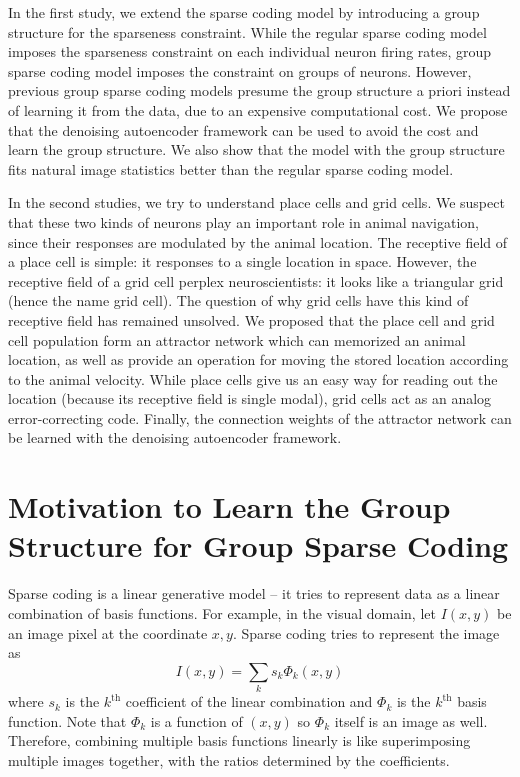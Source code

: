 In the first study, we extend the sparse coding model by introducing a group structure for the sparseness constraint. While the regular sparse coding model imposes the sparseness constraint on each individual neuron firing rates, group sparse coding model imposes the constraint on groups of neurons. However, previous group sparse coding models presume the group structure a priori instead of learning it from the data, due to an expensive computational cost. We propose that the denoising autoencoder framework can be used to avoid the cost and learn the group structure. We also show that the model with the group structure fits natural image statistics better than the regular sparse coding model.

In the second studies, we try to understand place cells and grid cells. We suspect that these two kinds of neurons play an important role in animal navigation, since their responses are modulated by the animal location. The receptive field of a place cell is simple: it responses to a single location in space. However, the receptive field of a grid cell perplex neuroscientists: it looks like a triangular grid (hence the name grid cell). The question of why grid cells have this kind of receptive field has remained unsolved. We proposed that the place cell and grid cell population form an attractor network which can memorized an animal location, as well as provide an operation for moving the stored location according to the animal velocity. While place cells give us an easy way for reading out the location (because its receptive field is single modal), grid cells act as an analog error-correcting code. Finally, the connection weights of the attractor network can be learned with the denoising autoencoder framework.

\section{Motivation to Learn the Group Structure for Group Sparse Coding}

Sparse coding is a linear generative model -- it tries to represent data as a linear combination of basis functions. For example, in the visual domain, let $I(x, y)$ be an image pixel at the coordinate $x,y$. Sparse coding tries to represent the image as
\begin{equation}
I(x,y) = \sum_k s_k \Phi_k(x,y)
\end{equation}
where $s_k$ is the $k^{\text{th}}$ coefficient of the linear combination and $\Phi_k$ is the $k^{\text{th}}$ basis function. Note that $\Phi_k$ is a function of $(x,y)$ so $\Phi_k$ itself is an image as well. Therefore, combining multiple basis functions linearly is like superimposing multiple images together, with the ratios determined by the coefficients.

